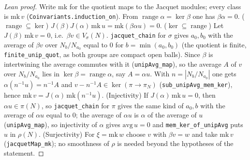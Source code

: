 \begin{proof}[Lean proof]
Write $\mathrm{mk}$ for the quotient maps to the Jacquet modules; every class is $\mathrm{mk}\,v$ (\texttt{Coinvariants.induction\_on}). From $\operatorname{range}\alpha=\ker\beta$ one has $\beta\alpha=0$. ($\operatorname{range}\subseteq\ker$) $J(\beta)J(\alpha)\,\mathrm{mk}\,u=\mathrm{mk}(\beta\alpha u)=0$. ($\ker\subseteq\operatorname{range}$) Let $J(\beta)\,\mathrm{mk}\,v=0$, i.e.\ $\beta v\in V_\sigma(N)$. \texttt{jacquet\_chain} for $\sigma$ gives $a_0,b_0$ with the average of $\beta v$ over $N_{b}/N_{a_0}$ equal to $0$ for $b=\min(a_0,b_0)$ (the quotient is finite, \texttt{finite\_unip\_quot}, as both groups are compact open balls). Since $\beta$ is intertwining the average commutes with it (\texttt{unipAvg\_map}), so the average $A$ of $v$ over $N_b/N_{a_0}$ lies in $\ker\beta=\operatorname{range}\alpha$, say $A=\alpha u$. With $n=|N_b/N_{a_0}|$ one gets $\alpha(n^{-1}u)=n^{-1}A$ and $v-n^{-1}A\in\ker(\pi\to\pi_N)$ (\texttt{sub\_unipAvg\_mem\_ker}), hence $\mathrm{mk}\,v=J(\alpha)\,\mathrm{mk}(n^{-1}u)$. (Injectivity) If $J(\alpha)\,\mathrm{mk}\,u=0$, then $\alpha u\in\pi(N)$, so \texttt{jacquet\_chain} for $\pi$ gives the same kind of $a_0,b$ with the average of $\alpha u$ equal to $0$; the average of $\alpha u$ is $\alpha$ of the average of $u$ (\texttt{unipAvg\_map}), so injectivity of $\alpha$ gives $\mathrm{avg}\,u=0$ and \texttt{mem\_ker\_of\_unipAvg} puts $u$ in $\rho(N)$. (Surjectivity) For $\xi=\mathrm{mk}\,w$ choose $v$ with $\beta v=w$ and take $\mathrm{mk}\,v$ (\texttt{jacquetMap\_mk}); no smoothness of $\rho$ is needed beyond the hypotheses of the statement.
\end{proof}


